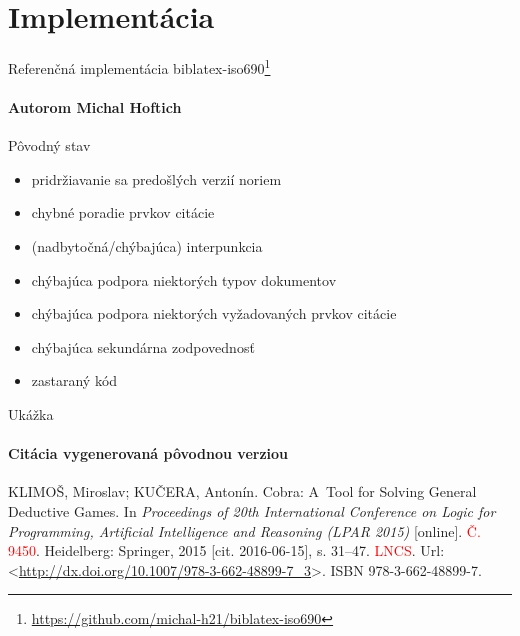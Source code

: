 \documentclass{beamer}
\begin{document}
\section{Implementácia}


\begin{frame}{Referenčná implementácia \textsf{biblatex-iso690}\footnote[frame]{\url{https://github.com/michal-h21/biblatex-iso690}}}
\framesubtitle{Autorom Michal Hoftich}
Pôvodný stav
\begin{itemize}
\item pridržiavanie sa predošlých verzií noriem %
\item chybné poradie prvkov citácie %
\item (nadbytočná/chýbajúca) interpunkcia %
\item chýbajúca podpora niektorých typov dokumentov %
\item chýbajúca podpora niektorých vyžadovaných prvkov citácie %
\item chýbajúca sekundárna zodpovednosť %
\item zastaraný kód %
\end{itemize}
\end{frame}

\begin{frame}{Ukážka}
\framesubtitle{Citácia vygenerovaná pôvodnou verziou}
\begin{thebibliography}{9}
  KLIMOŠ, Miroslav; KUČERA, Antonín. Cobra: A~Tool for Solving General Deductive Games. In \emph{Proceedings of 20th International Conference on Logic for Programming, Artificial Intelligence and Reasoning (LPAR 2015)} [online]. \textcolor<2>{Red}{Č. 9450}. Heidelberg: Springer, 2015 [cit. 2016-06-15], s. 31–47. \textcolor<2>{Red}{LNCS}. Url: <\url{http://dx.doi.org/10.1007/978-3-662-48899-7_3}>. ISBN 978-3-662-48899-7.
\end{thebibliography}
\end{frame}
\end{document}
